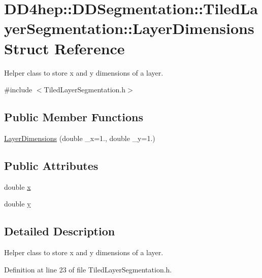 \hypertarget{struct_d_d4hep_1_1_d_d_segmentation_1_1_tiled_layer_segmentation_1_1_layer_dimensions}{}\section{D\+D4hep\+:\+:D\+D\+Segmentation\+:\+:Tiled\+Layer\+Segmentation\+:\+:Layer\+Dimensions Struct Reference}
\label{struct_d_d4hep_1_1_d_d_segmentation_1_1_tiled_layer_segmentation_1_1_layer_dimensions}


Helper class to store x and y dimensions of a layer.  




{\ttfamily \#include $<$Tiled\+Layer\+Segmentation.\+h$>$}

\subsection*{Public Member Functions}
\begin{DoxyCompactItemize}
\item 
\hyperlink{struct_d_d4hep_1_1_d_d_segmentation_1_1_tiled_layer_segmentation_1_1_layer_dimensions_a947970ce64990889e5766b397fd0908e}{Layer\+Dimensions} (double \+\_\+x=1., double \+\_\+y=1.)
\end{DoxyCompactItemize}
\subsection*{Public Attributes}
\begin{DoxyCompactItemize}
\item 
double \hyperlink{struct_d_d4hep_1_1_d_d_segmentation_1_1_tiled_layer_segmentation_1_1_layer_dimensions_ad7a5356dc198baab61c1a34fc38d22fc}{x}
\item 
double \hyperlink{struct_d_d4hep_1_1_d_d_segmentation_1_1_tiled_layer_segmentation_1_1_layer_dimensions_a11c49c068bf574008a598dd0fbd5df31}{y}
\end{DoxyCompactItemize}


\subsection{Detailed Description}
Helper class to store x and y dimensions of a layer. 

Definition at line 23 of file Tiled\+Layer\+Segmentation.\+h.



